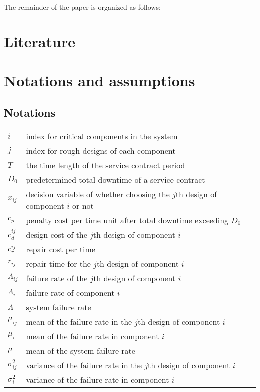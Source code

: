 \documentclass[10pt,a4paper]{article}
\begin{document}
The remainder of the paper is organized as follows:





\section{Literature}

\section{Notations and assumptions}
 \subsection{Notations}
   \begin{tabular}{l l}
$i$ & index for critical components in the system\\
$j$ & index for rough designs of each component\\
$T$ & the time length of the service contract period\\
$D_0$ & predetermined total downtime of a service contract\\
$x_{ij}$ & decision variable of whether choosing the $j$th design of component $i$ or not\\
$c_p$ & penalty cost per time unit after total downtime exceeding $D_0$\\
$c^{ij}_{d}$ & design cost of the $j$th design of component $i$\\
$c_r^{ij}$ & repair cost per time\\
$r_{ij}$ & repair time for the $j$th design of component $i$\\
$\Lambda_{ij}$ & failure rate of the $j$th design of component $i$\\
$\Lambda_{i}$  & failure rate of component $i$\\
$\Lambda$  & system failure rate\\
$\mu_{ij}$ & mean of the failure rate in the $j$th design of component $i$ \\
$\mu_{i}$ & mean of the failure rate in component $i$ \\
$\mu$ & mean of the system failure rate \\
$\sigma_{ij}^{2}$ & variance of the failure rate in the $j$th design of component $i$\\
$\sigma_{i}^{2}$ &  variance of the failure rate in component $i$ \\

\end{tabular}
\end{document}
